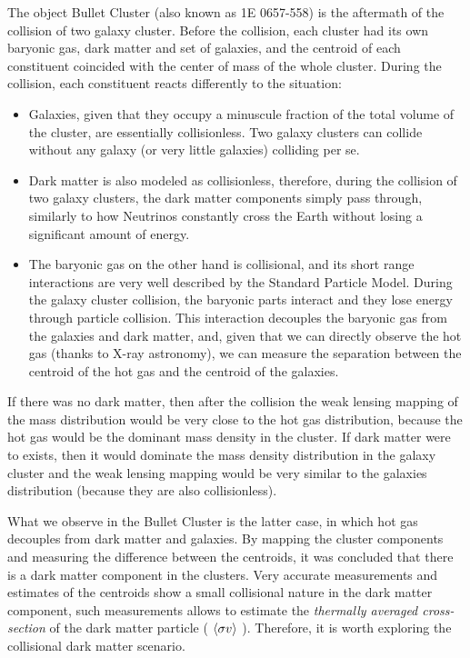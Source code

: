 The object Bullet Cluster (also known as 1E 0657-558) is the aftermath of the collision of two galaxy cluster.
Before the collision, each cluster had its own baryonic gas, dark matter and set of galaxies, and the centroid of each constituent coincided with the center of mass of the whole cluster.
During the collision, each constituent reacts differently to the situation:
\begin{itemize}
\item Galaxies, given that they occupy a minuscule fraction of the total volume of the cluster, are essentially collisionless. Two galaxy clusters can collide without any galaxy (or very little galaxies) colliding per se. 
\item Dark matter is also modeled as collisionless, therefore, during the collision of two galaxy clusters, the dark matter components simply pass through, similarly to how Neutrinos constantly cross the Earth without losing a significant amount of energy.
\item The baryonic gas on the other hand is collisional, and its short range interactions are very well described by the Standard Particle Model. During the galaxy cluster collision, the baryonic parts interact and they lose energy through particle collision. This interaction decouples the baryonic gas from the galaxies and dark matter, and, given that we can directly observe the hot gas (thanks to X-ray astronomy), we can measure the separation between the centroid of the hot gas and the centroid of the galaxies.
\end{itemize}

If there was no dark matter, then after the collision the weak lensing mapping of the mass distribution would be very close to the hot gas distribution, because the hot gas would be the dominant mass density in the cluster. If dark matter were to exists, then it would dominate the mass density distribution in the galaxy cluster and the weak lensing mapping would be very similar to the galaxies distribution (because they are also collisionless).

What we observe in the Bullet Cluster is the latter case, in which hot gas decouples from dark matter and galaxies.
By mapping the cluster components and measuring the difference between the centroids, it was concluded that there is a dark matter component in the clusters.
Very accurate measurements and estimates of the centroids show a small collisional nature in the dark matter component, such measurements allows to estimate the \emph{thermally averaged cross-section} of the dark matter particle ( $\langle \sigma v \rangle$ ).
Therefore, it is worth exploring the collisional dark matter scenario.

